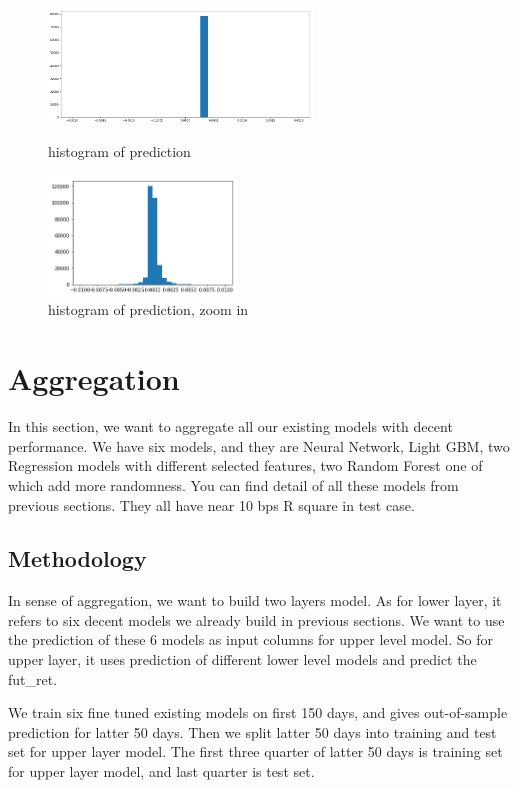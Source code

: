 \documentclass[onecolumn]{article}
\begin{document}
\begin{figure}[htbp]
\centering
\begin{minipage}[t]{0.48\textwidth}
\centering
\includegraphics[width=7cm]{nn_2.png}
\caption{histogram of prediction}
\end{minipage}
\begin{minipage}[t]{0.48\textwidth}
\centering
\includegraphics[width=5cm]{nn_3.png}
\caption{histogram of prediction, zoom in}
\end{minipage}
\end{figure}


\section{Aggregation}
In this section, we want to aggregate all our existing models with decent performance. We have six models, and they are Neural Network, Light GBM, two Regression models with different selected features, two Random Forest one of which add more randomness. You can find detail of all these models from previous sections. They all have near 10 bps R square in test case.

\subsection{Methodology}
In sense of aggregation, we want to build two layers model. As for lower layer, it refers to six decent models we already build in previous sections. We want to use the prediction of these 6 models as input columns for upper level model. So for upper layer, it uses prediction of different lower level models and predict the fut\_ret. 

We train six fine tuned existing models on first 150 days, and gives out-of-sample prediction for latter 50 days. Then we split latter 50 days into training and test set for upper layer model. The first three quarter of latter 50 days is training set for upper layer model, and last quarter is test set.
\end{document}
